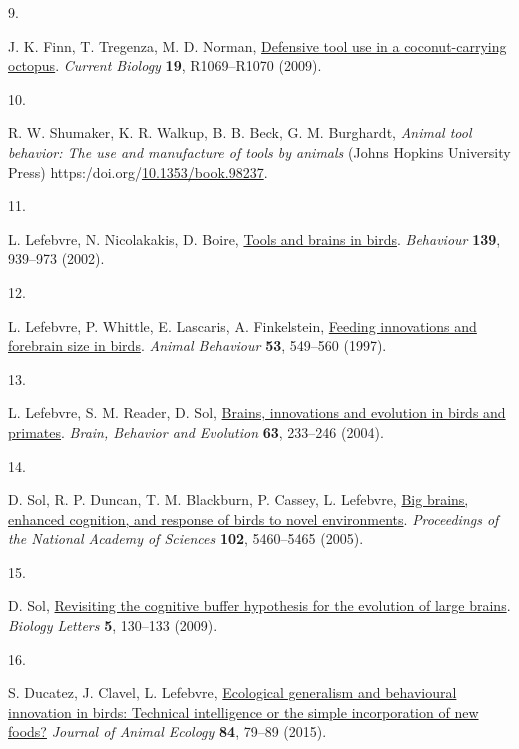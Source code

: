 \documentclass[
  man,floatsintext]{apa6}
\newlength{\cslhangindent}
\newlength{\csllabelwidth}
\newlength{\cslentryspacingunit} %
\newenvironment{CSLReferences}[2] %
 {%
  \setlength{\parindent}{0pt}
  \ifodd #1
  \let\oldpar\par
  \def\par{\hangindent=\cslhangindent\oldpar}
  \fi
  \setlength{\parskip}{#2\cslentryspacingunit}
 }%
 {}
\newcommand{\CSLLeftMargin}[1]{\parbox[t]{\csllabelwidth}{#1}}
\newcommand{\CSLRightInline}[1]{\parbox[t]{\linewidth - \csllabelwidth}{#1}\break}
\begin{document}
\begin{CSLReferences}{0}{0}
\leavevmode{}%
\CSLLeftMargin{9. }%
\CSLRightInline{J. K. Finn, T. Tregenza, M. D. Norman, \href{https://doi.org/10.1016/j.cub.2009.10.052}{Defensive tool use in a coconut-carrying octopus}. \emph{Current Biology} \textbf{19}, R1069--R1070 (2009).}

\leavevmode{}%
\CSLLeftMargin{10. }%
\CSLRightInline{R. W. Shumaker, K. R. Walkup, B. B. Beck, G. M. Burghardt, \emph{Animal tool behavior: The use and manufacture of tools by animals} (Johns Hopkins University Press) https:/doi.org/\href{https://doi.org/10.1353/book.98237}{10.1353/book.98237}.}

\leavevmode{}%
\CSLLeftMargin{11. }%
\CSLRightInline{L. Lefebvre, N. Nicolakakis, D. Boire, \href{https://doi.org/10.1163/156853902320387918}{Tools and brains in birds}. \emph{Behaviour} \textbf{139}, 939--973 (2002).}

\leavevmode{}%
\CSLLeftMargin{12. }%
\CSLRightInline{L. Lefebvre, P. Whittle, E. Lascaris, A. Finkelstein, \href{https://doi.org/10.1006/anbe.1996.0330}{Feeding innovations and forebrain size in birds}. \emph{Animal Behaviour} \textbf{53}, 549--560 (1997).}

\leavevmode{}%
\CSLLeftMargin{13. }%
\CSLRightInline{L. Lefebvre, S. M. Reader, D. Sol, \href{https://doi.org/10.1159/000076784}{Brains, innovations and evolution in birds and primates}. \emph{Brain, Behavior and Evolution} \textbf{63}, 233--246 (2004).}

\leavevmode{}%
\CSLLeftMargin{14. }%
\CSLRightInline{D. Sol, R. P. Duncan, T. M. Blackburn, P. Cassey, L. Lefebvre, \href{https://doi.org/10.1073/pnas.0408145102}{Big brains, enhanced cognition, and response of birds to novel environments}. \emph{Proceedings of the National Academy of Sciences} \textbf{102}, 5460--5465 (2005).}

\leavevmode{}%
\CSLLeftMargin{15. }%
\CSLRightInline{D. Sol, \href{https://doi.org/10.1098/rsbl.2008.0621}{Revisiting the cognitive buffer hypothesis for the evolution of large brains}. \emph{Biology Letters} \textbf{5}, 130--133 (2009).}

\leavevmode{}%
\CSLLeftMargin{16. }%
\CSLRightInline{S. Ducatez, J. Clavel, L. Lefebvre, \href{https://doi.org/10.1111/1365-2656.12255}{Ecological generalism and behavioural innovation in birds: Technical intelligence or the simple incorporation of new foods?} \emph{Journal of Animal Ecology} \textbf{84}, 79--89 (2015).}


\end{CSLReferences}
\end{document}
